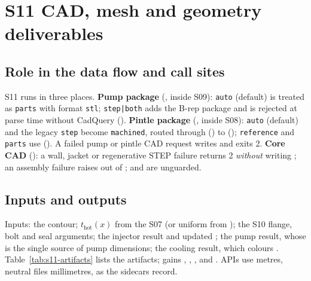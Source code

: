 \section{S11 CAD, mesh and geometry deliverables}\label{sec:s11}

\subsection{Role in the data flow and call sites}

S11 runs in three places. \textbf{Pump package} (, inside S09):  \texttt{auto} (default) is treated as \texttt{parts} with format \texttt{stl};  \texttt{step|both} adds the B-rep package and is rejected at parse time without CadQuery (). \textbf{Pintle package} (, inside S08):  \texttt{auto} (default) and the legacy \texttt{step} become \texttt{machined}, routed through  () to  (); \texttt{reference} and \texttt{parts} use  (). A failed pump or pintle CAD request writes  and exits 2. \textbf{Core CAD} (): a wall, jacket or regenerative STEP failure returns 2 \emph{without} writing ; an assembly failure raises  out of ;  and  are unguarded.

\subsection{Inputs and outputs}

Inputs: the contour; $t_\mathrm{hot}(x)$ from the S07  (or uniform from ); the S10 flange, bolt and seal arguments; the injector result and updated ; the pump result, whose  is the single source of pump dimensions; the cooling result, which colours . Table~\ref{tab:s11-artifacts} lists the artifacts;  gains , , ,  and . APIs use metres, neutral files millimetres, as the sidecars record.

